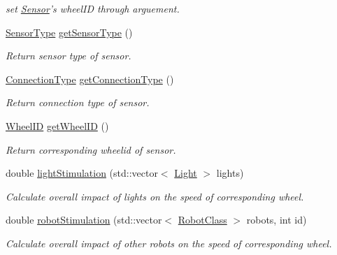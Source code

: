 \begin{DoxyCompactItemize}
\begin{DoxyCompactList}\small\item\em set \hyperlink{classSensor}{Sensor}'s wheel\-I\-D through arguement. \end{DoxyCompactList}\item 
\hyperlink{Sensor_8h_a213c434cb928c4ca22513e2302632435}{Sensor\-Type} \hyperlink{classSensor_aea7a13517a764fc70f77d5d0824cbd51}{get\-Sensor\-Type} ()
\begin{DoxyCompactList}\small\item\em Return sensor type of sensor. \end{DoxyCompactList}\item 
\hyperlink{Sensor_8h_aa1f0e2efd52935fd01bfece0fbead81f}{Connection\-Type} \hyperlink{classSensor_ac998ec509e76c013abbbea3bc30db98b}{get\-Connection\-Type} ()
\begin{DoxyCompactList}\small\item\em Return connection type of sensor. \end{DoxyCompactList}\item 
\hyperlink{Sensor_8h_a231524b302f9d7e6dd216fa89296f844}{Wheel\-I\-D} \hyperlink{classSensor_a44609d6da189a8116b5023b85f0dec12}{get\-Wheel\-I\-D} ()
\begin{DoxyCompactList}\small\item\em Return corresponding wheelid of sensor. \end{DoxyCompactList}\item 
double \hyperlink{classSensor_a560a87babd7998b2b2c84f798dfb360e}{light\-Stimulation} (std\-::vector$<$ \hyperlink{classLight}{Light} $>$ lights)
\begin{DoxyCompactList}\small\item\em Calculate overall impact of lights on the speed of corresponding wheel. \end{DoxyCompactList}\item 
double \hyperlink{classSensor_a5797582193b7b896212622321efa5b40}{robot\-Stimulation} (std\-::vector$<$ \hyperlink{classRobotClass}{Robot\-Class} $>$ robots, int id)
\begin{DoxyCompactList}\small\item\em Calculate overall impact of other robots on the speed of corresponding wheel. \end{DoxyCompactList}\end{DoxyCompactItemize}
